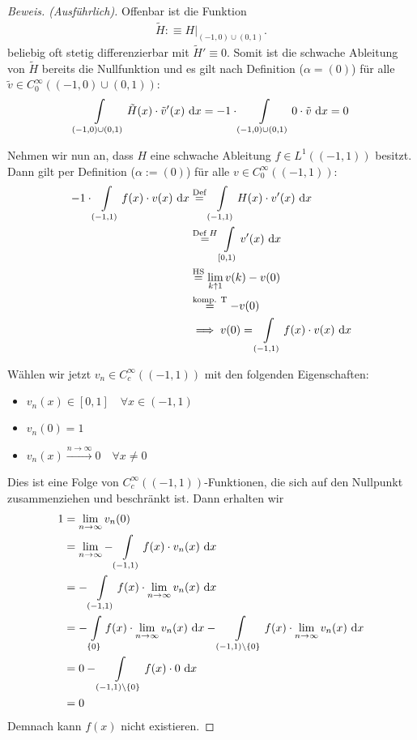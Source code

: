 \documentclass[12pt,a4paper]{article}
\begin{document}
\begin{proof}[Beweis. (Ausführlich)]
Offenbar ist die Funktion
\begin{align*}
\tilde{H}:\equiv H|_{(-1,0)\cup(0,1)}.
\end{align*}
beliebig oft stetig differenzierbar mit $\tilde{H}'\equiv0$. Somit ist die schwache Ableitung von $\tilde{H}$ bereits die Nullfunktion und es gilt nach Definition ($\alpha=(0)$) für alle $\tilde{v}\in C_0^\infty((-1,0)\cup(0,1))$:
\begin{align*}
\int\limits_{(-1,0)\cup(0,1)}\tilde{H}(x)\cdot \tilde{v}'(x)\text{ d} x=-1\cdot\int\limits_{(-1,0)\cup(0,1)} 0\cdot \tilde{v}\text{ d} x=0
\end{align*}

Nehmen wir nun an, dass $H$ eine schwache Ableitung $f\in L^1((-1,1))$ besitzt. Dann gilt per Definition ($\alpha:=(0)$) für alle $v\in C_0^\infty((-1,1))$:
\begin{align*}
-1\cdot\int\limits_{(-1,1)} f(x)\cdot v(x)\text{ d} x
&\stackrel{\text{Def}}{=}
\int\limits_{(-1,1)} H(x)\cdot v'(x)\text{ d} x\\
&\stackrel{\text{Def }H}{=}
\int\limits_{[0,1)} v'(x)\text{ d} x\\
&\stackrel{\text{HS}}{=}
\lim\limits_{k\uparrow 1} v(k)-v(0)\\
&\stackrel{\text{komp. T}}{=}
-v(0)\\
&\implies v(0)=\int\limits_{(-1,1)}f(x)\cdot v(x)\text{ d} x
\end{align*}

Wählen wir jetzt $v_n\in C^\infty_c((-1,1))$ mit den folgenden Eigenschaften:
\begin{itemize}
	\item $v_n(x)\in[0,1]\quad \forall x\in (-1,1)$
	\item $v_n(0)=1$
	\item $v_n(x)\stackrel{n\rightarrow\infty}{\longrightarrow}0\quad\forall x\neq 0$
\end{itemize}
Dies ist eine Folge von $C^\infty_c((-1,1))$-Funktionen, die sich auf den Nullpunkt zusammenziehen
und beschränkt ist.
Dann erhalten wir
\begin{align*}
	1 &=\lim\limits_{n\rightarrow\infty} v_n(0) \\
	&=\lim\limits_{n\rightarrow\infty}-\int\limits_{(-1,1)} f(x)\cdot v_n(x)\text{ d} x \\
	&=-\int\limits_{(-1,1)} f(x)\cdot\lim\limits_{n\rightarrow\infty} v_n(x)\text{ d} x \\
	&=-\int\limits_{\{0\}} f(x)\cdot\lim\limits_{n\rightarrow\infty} v_n(x)\text{ d} x 
	-\int\limits_{(-1,1)\setminus\{0\}} f(x)\cdot\lim\limits_{n\rightarrow\infty} v_n(x)\text{ d} x \\
	&= 0 -\int\limits_{(-1,1)\setminus\{0\}} f(x)\cdot 0\text{ d} x \\
	&= 0
\end{align*}
Demnach kann $f(x)$ nicht existieren.
\end{proof}
\end{document}
